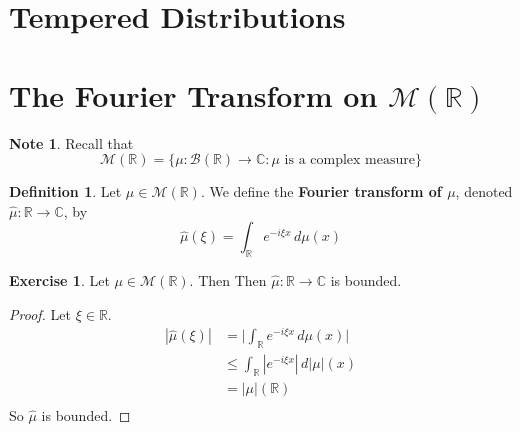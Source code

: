 \documentclass{book}
\theoremstyle{definition}
\newtheorem{defn}[definition]{Definition}
\newtheorem{note}[definition]{Note}
\newtheorem{ex}[definition]{Exercise}
\newcommand{\C}{\mathbb{C}}
\newcommand{\R}{\mathbb{R}}
\newcommand{\MB}{\mathcal{B}}
\newcommand{\MM}{\mathcal{M}}
\DeclareMathOperator*{\0}{\mbf{0}}
\DeclareMathOperator*{\1}{\mbf{1}}
\newcommand{\dmu}{\, d \mu}
\begin{document}
	
	
	
	
	
	
	
	
	
	
	
	
	
	
	
	
	
	
	
	
	
	
	
	
	
	\newpage
	\section{Tempered Distributions}
	
	
	
	
	
	
	
	
	
	
	
	
	
	
	
	
	
	
	
	\newpage
	\section{The Fourier Transform on $\MM(\R)$}
	
	\begin{note}
		Recall that $$\MM(\R) = \{\mu: \MB(\R) \rightarrow \C: \mu \text{ is a complex measure}\}$$
	\end{note}
	
	\begin{defn}
		Let $\mu \in \MM(\R)$. We define the \textbf{Fourier transform of $\mu$}, denoted $\hat{\mu}: \R \rightarrow \C$, by
		$$\hat{\mu}(\xi) = \int_{\R} e^{-i \xi x} \dmu(x)$$ 
	\end{defn}
	
	\begin{ex}
		Let $\mu \in \MM(\R)$. Then Then $\hat{\mu} : \R \rightarrow \C$ is bounded.
	\end{ex}
	
	\begin{proof}
		Let $\xi \in \R$. 
		\begin{align*}
			|\hat{\mu}(\xi)|
			& = \bigg | \int_{\R} e^{-i \xi x} \dmu(x) \bigg| \\
			& \leq \int_{\R} |e^{-i \xi x}| \, d|\mu|(x) \\
			& = |\mu|(\R) \\
		\end{align*}
		So $\hat{\mu}$ is bounded.
	\end{proof}
	
\end{document}
